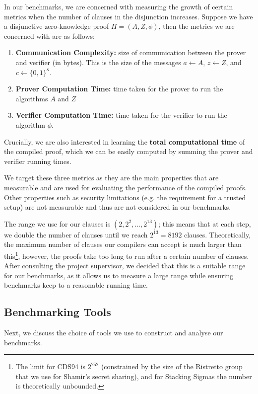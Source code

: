 In our benchmarks, we are concerned with measuring the growth of certain 
metrics when the number of clauses in the disjunction increases. Suppose 
we have a disjunctive zero-knowledge proof $\Pi = (A, Z, \phi)$, then 
the metrics we are concerned with are as follows:
\begin{enumerate}
  \item \textbf{Communication Complexity:} 
  size of communication between the prover and verifier (in bytes). This is 
  the size of the messages $a \leftarrow A$, $z \leftarrow Z$, and $c \leftarrow \{0,1\}^\kappa$.
  \item \textbf{Prover Computation Time:}
  time taken for the prover to run the algorithms $A$ and $Z$ 
  \item \textbf{Verifier Computation Time:}
  time taken for the verifier to run the algorithm $\phi$.
\end{enumerate}

Crucially, we are also interested in learning the \textbf{total computational time} of 
the compiled proof, which we can be easily computed by summing the prover and verifier 
running times. 

We target these three metrics as they are the main properties 
that are measurable and are used for evaluating the performance of the compiled 
proofs. Other properties such as security limitations (e.g. the requirement for a
trusted setup) are not measurable and thus are not considered in our benchmarks.

The range we use for our clauses is $(2, 2^2, \ldots, 2^{13})$; this means that 
at each step, we double the number of clauses until we reach $2^{13} = 8192$ clauses. 
Theoretically, the maximum number of clauses our compilers can accept is much larger than 
this\footnote{The limit for CDS94 is $2^{252}$ (constrained by the size of the Ristretto group 
\cite{ristretto_web} that we use for Shamir's secret sharing), and for Stacking Sigmas the number 
is theoretically unbounded.}, however, the proofs take too long to run after a certain number of clauses. 
After consulting the project supervisor, we decided that this is a suitable range for our benchmarks, 
as it allows us to measure a large range while ensuring benchmarks keep to a reasonable running time. 

\subsection{Benchmarking Tools}
Next, we discuss the choice of tools we use to construct and 
analyse our benchmarks.

